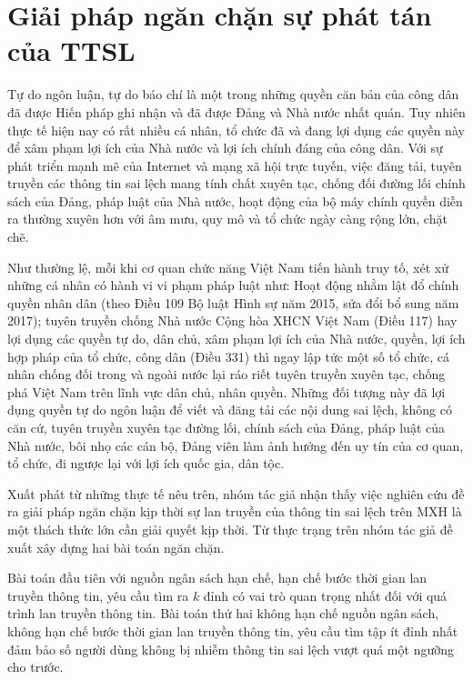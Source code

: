 \chapter{Giải pháp ngăn chặn sự phát tán của TTSL}

Tự do ngôn luận, tự do báo chí là một trong những quyền căn bản của công dân đã được Hiến pháp ghi nhận và đã được Đảng và Nhà nước nhất quán. Tuy nhiên thực tế hiện nay có rất nhiều cá nhân, tổ chức đã và đang lợi dụng các quyền này để xâm phạm lợi ích của Nhà nước và lợi ích chính đáng của công dân. Với sự phát triển mạnh mẽ của Internet và mạng xã hội trực tuyến, việc đăng tải, tuyên truyền các thông tin sai lệch mang tính chất xuyên tạc, chống đối đường lối chính sách của Đảng, pháp luật của Nhà nước, hoạt động của bộ máy chính quyền diễn ra thường xuyên hơn với âm mưu, quy mô và tổ chức ngày càng rộng lớn, chặt chẽ.

Như thường lệ, mỗi khi cơ quan chức năng Việt Nam tiến hành truy tố, xét xử những cá nhân có hành vi vi phạm pháp luật như: Hoạt động nhằm lật đổ chính quyền nhân dân (theo Điều 109 Bộ luật Hình sự năm 2015, sửa đổi bổ sung năm 2017); tuyên truyền chống Nhà nước Cộng hòa XHCN Việt Nam (Điều 117) hay lợi dụng các quyền tự do, dân chủ, xâm phạm lợi ích của Nhà nước, quyền, lợi ích hợp pháp của tổ chức, công dân (Điều 331) thì ngay lập tức một số tổ chức, cá nhân chống đối trong và ngoài nước lại ráo riết tuyên truyền xuyên tạc, chống phá Việt Nam trên lĩnh vực dân chủ, nhân quyền. Những đối tượng này đã lợi dụng quyền tự do ngôn luận để viết và đăng tải các nội dung sai lệch, không có căn cứ, tuyên truyền xuyên tạc đường lối, chính sách của Đảng, pháp luật của Nhà nước, bôi nhọ các cán bộ, Đảng viên làm ảnh hưởng đến uy tín của cơ quan, tổ chức, đi ngược lại với lợi ích quốc gia, dân tộc.

Xuất phát từ những thực tế nêu trên, nhóm tác giả nhận thấy việc nghiên cứu đề ra giải pháp ngăn chặn kịp thời sự lan truyền của thông tin sai lệch trên MXH là một thách thức lớn cần giải quyết kịp thời. Từ thực trạng trên nhóm tác giả đề xuất xây dựng hai bài toán ngăn chặn.

Bài toán đầu tiên với nguồn ngân sách hạn chế, hạn chế bước thời gian lan truyền thông tin, yêu cầu tìm ra $k$ đỉnh có vai trò quan trọng nhất đối với quá trình lan truyền thông tin. Bài toán thứ hai không hạn chế nguồn ngân sách, không hạn chế bước thời gian lan truyền thông tin, yêu cầu tìm tập ít đỉnh nhất đảm bảo số người dùng không bị nhiễm thông tin sai lệch vượt quá một ngưỡng cho trước.

